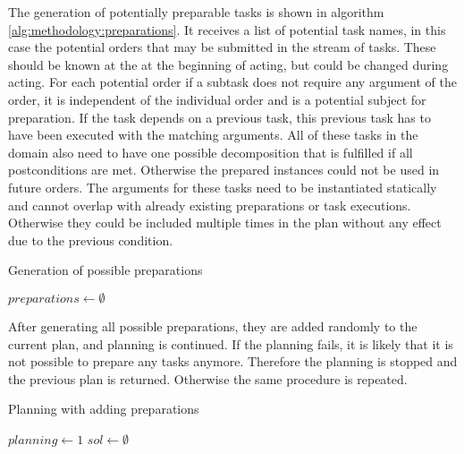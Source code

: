 The generation of potentially preparable tasks is shown in algorithm \ref{alg:methodology:preparations}.
It receives a list of potential task names, in this case the potential orders that may be submitted in the stream of tasks.
These should be known at the at the beginning of acting, but could be changed during acting.
For each potential order if a subtask does not require any argument of the order, it is independent of the individual order and is a potential subject for preparation.
If the task depends on a previous task, this previous task has to have been executed with the matching arguments.
All of these tasks in the domain also need to have one possible decomposition that is fulfilled if all postconditions are met.
Otherwise the prepared instances could not be used in future orders.
The arguments for these tasks need to be instantiated statically and cannot overlap with already existing preparations or task executions.
Otherwise they could be included multiple times in the plan without any effect due to the previous condition.


\begin{algorithm}
    \caption{Generation of possible preparations}
    \label{alg:methodology:preparations}
    $preparations \leftarrow \emptyset$\;
\end{algorithm}

After generating all possible preparations, they are added randomly to the current plan, and planning is continued.
If the planning fails, it is likely that it is not possible to prepare any tasks anymore.
Therefore the planning is stopped and the previous plan is returned.
Otherwise the same procedure is repeated.

\begin{algorithm}
    \caption{Planning with adding preparations}
    \label{alg:methodology:planning}
    $planning \leftarrow 1$\;
    $sol \leftarrow \emptyset$\;
\end{algorithm}